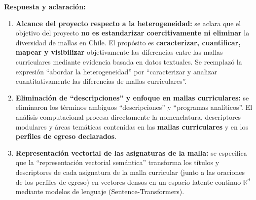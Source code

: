 \noindent
{}

\vspace{0.2cm}

\noindent
\textbf{Respuesta y aclaración:}
\begin{enumerate}[leftmargin=*]
	\item \textbf{Alcance del proyecto respecto a la heterogeneidad:} se aclara que el objetivo del proyecto \textbf{no es estandarizar coercitivamente ni eliminar} la diversidad de mallas en Chile. El propósito es \textbf{caracterizar, cuantificar, mapear y visibilizar} objetivamente las diferencias entre las mallas curriculares mediante evidencia basada en datos textuales. Se reemplazó la expresión ``abordar la heterogeneidad'' por ``caracterizar y analizar cuantitativamente las diferencias de mallas curriculares''.
	\item \textbf{Eliminación de ``descripciones'' y enfoque en mallas curriculares:} se eliminaron los términos ambiguos ``descripciones'' y ``programas analíticos''. El análisis computacional procesa directamente la nomenclatura, descriptores modulares y áreas temáticas contenidas en las \textbf{mallas curriculares} y en los \textbf{perfiles de egreso declarados}.
	\item \textbf{Representación vectorial de las asignaturas de la malla:} se especifica que la ``representación vectorial semántica'' transforma los títulos y descriptores de cada asignatura de la malla curricular (junto a las oraciones de los perfiles de egreso) en vectores densos en un espacio latente continuo $\mathbb{R}^d$ mediante modelos de lenguaje (Sentence-Transformers).
\end{enumerate}

\newpage

